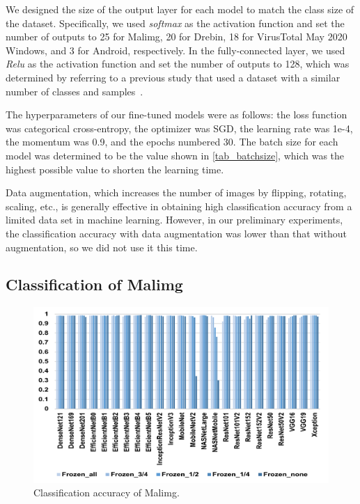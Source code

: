 \documentclass[conference]{IEEEtran}
\begin{document}
We designed the size of the output layer for each model to match the class size of the dataset. 
Specifically, we used \emph{softmax} as the activation function and set the number of outputs to 25 for Malimg, 20 for Drebin, 18 for VirusTotal May 2020 Windows, and 3 for Android, respectively. 
In the fully-connected layer, we used \emph{Relu} as the activation function and set the number of outputs to 128, which was determined by referring to a previous study that used a dataset with a similar number of classes and samples~\cite{10.1145/3342999.3343002}. 

The hyperparameters of our fine-tuned models were as follows: the loss function was categorical cross-entropy, the optimizer was SGD, the learning rate was 1e-4, the momentum was 0.9, and the epochs numbered 30. 
The batch size for each model was determined to be the value shown in \autoref{tab_batchsize}, which was the highest possible value to shorten the learning time.

Data augmentation, which increases the number of images by flipping, rotating, scaling, etc., is generally effective in obtaining high classification accuracy from a limited data set in machine learning.
However, in our preliminary experiments, the classification accuracy with data augmentation was lower than that without augmentation, so we did not use it this time.

\subsection{Classification of Malimg}
\label{sec_malimg}

\begin{figure}[t]
	\centering
	\includegraphics[width=\linewidth,clip]{Malimg.pdf}
	\caption{Classification accuracy of Malimg.}
	\label{fig_malimg}
\end{figure}
\end{document}
